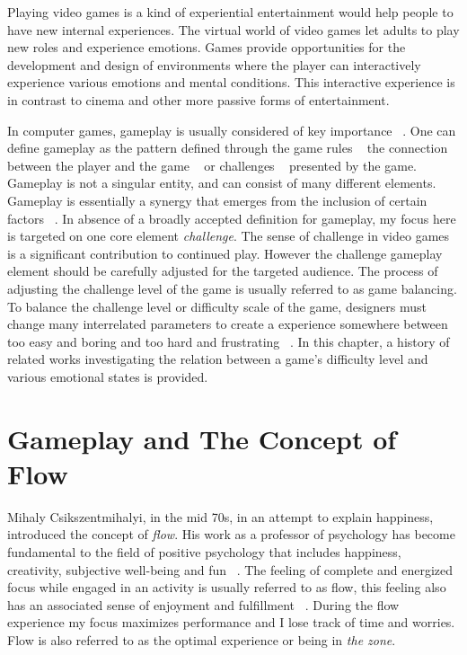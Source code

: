 
Playing video games is a kind of experiential entertainment would help people to have new internal experiences. The virtual world of video games let adults to play new roles and experience emotions. Games provide opportunities for the development and design of environments where the player can interactively experience various emotions and mental conditions. This interactive experience is in contrast to cinema and other more passive forms of entertainment.

In computer games, gameplay is usually considered of key importance ~\cite{rollings2006fundamentals, malone1982makes}. One can define gameplay as the pattern defined through the game rules ~\cite{salen2004rules, pajares2008understanding} the connection between the player and the game ~\cite{laramee2002game} or challenges ~\cite{rollings2003andrew} presented by the game. Gameplay is not a singular entity, and can consist of many different elements. Gameplay is essentially a synergy that emerges from the inclusion of certain factors ~\cite{rollings2003andrew}. In absence of a broadly accepted definition for gameplay, my focus here is targeted on one core element \textit{challenge}. The sense of challenge in video games is a significant contribution to continued play. However the challenge gameplay element should be carefully adjusted for the targeted audience. The process of adjusting the challenge level of the game is usually referred to as game balancing. To balance the challenge level or difficulty scale of the game, designers must change many interrelated parameters to create a experience somewhere between too easy and boring and too hard and frustrating ~\cite{koster2013theory}. In this chapter, a history of related works investigating the relation between a game's difficulty level and various emotional states is provided.

\section{Gameplay and The Concept of Flow}
Mihaly Csikszentmihalyi, in the mid 70s, in an attempt to explain happiness, introduced the concept of \textit{flow}. His work as a professor of psychology has become fundamental to the field of positive psychology that includes happiness, creativity, subjective well-being and fun ~\cite{csikszentmihalyi1990flow}. The feeling of complete and energized focus while engaged in an activity is usually referred to as flow, this feeling also has an associated sense of enjoyment and fulfillment ~\cite{csikszentmihalyi1990flow}. During the flow experience my focus maximizes performance and I lose track of time and worries. Flow is also referred to as the optimal experience or being in \textit{the zone}.

